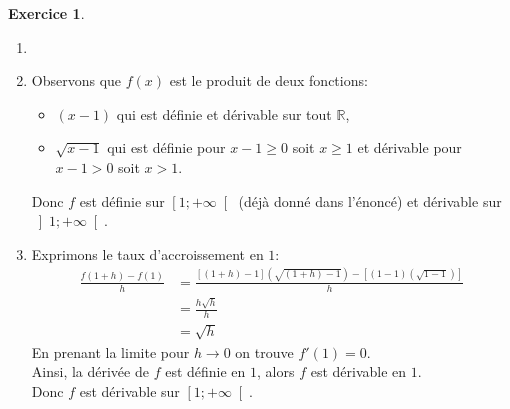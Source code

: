 \documentclass{exam}
\theoremstyle{definition}
\newtheorem{exercice}{Exercice}
\begin{document}
\begin{exercice}
    \begin{enumerate}
        \item[]
        \item Observons que $f(x)$ est le produit de deux fonctions:
        \begin{itemize}
            \item $(x-1)$ qui est définie et dérivable sur tout $\mathbb{R}$,
            \item $\sqrt{x-1}$ qui est définie pour $x - 1 \geq 0$ soit $x \geq 1$ et dérivable pour $x - 1 > 0$ soit $x > 1$.
        \end{itemize}
        Donc $f$ est définie sur $\left[1; +\infty\right[$ (déjà donné dans l'énoncé) et dérivable sur $\left]1; +\infty\right[$.
        \item Exprimons le taux d'accroissement en $1$:
        \begin{align*}
            \frac{f(1+h) - f(1)}{h} &= \frac{\left[(1+h)-1\right]\left(\sqrt{(1 + h) - 1}\right) - \left[(1 - 1)(\sqrt{1 - 1})\right]}{h}\\
            &= \frac{h\sqrt{h}}{h}\\
            &= \sqrt{h}
        \end{align*}
        En prenant la limite pour $h \rightarrow 0$ on trouve $f'(1) = 0$.\\
        Ainsi, la dérivée de $f$ est définie en $1$, alors $f$ est dérivable en $1$.\\
        Donc $f$ est dérivable sur $\left[1; +\infty\right[$.
    \end{enumerate}
\end{exercice}
\end{document}
